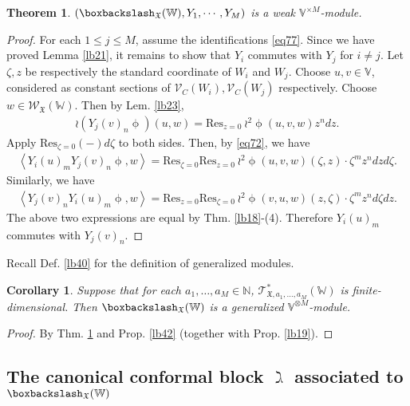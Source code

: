 \documentclass[11pt,b5paper,notitlepage]{article}
\theoremstyle{definition}
\theoremstyle{plain}
\newtheorem{thm}[df]{Theorem}
\newtheorem{co}[df]{Corollary}
\newcommand{\fk}{\mathfrak}
\newcommand{\Res}{\mathrm{Res}}
\newcommand{\SV}{\mathscr{V}}
\newcommand{\scr}{\mathscr}
\newcommand{\Vbb}{\mathbb V}
\newcommand{\Wbb}{\mathbb W}
\newcommand{\Nbb}{\mathbb N}
\newcommand{\<}{\left\langle}
\renewcommand{\>}{\right\rangle}
\newcommand{\fx}{\mathfrak{X}}
\newcommand{\bbs}{\boxbackslash}
\numberwithin{equation}{section}
\begin{document}
\begin{thm}\label{lb43}
    $(\boxbackslash_\fx(\Wbb),Y_1,\cdots,Y_M)$ is a weak $\Vbb^{\times M}$-module.
\end{thm}
\begin{proof}
For each $1\leq j\leq M$, assume the identifications \eqref{eq77}.   Since we have proved Lemma \ref{lb21},  it remains to show that $Y_i$ commutes with $Y_j$ for $i\ne j$. Let $\zeta,z$ be respectively the standard coordinate of $W_i$ and $W_j$. Choose $u,v\in \Vbb$, considered as constant sections of $\SV_C(W_i),\SV_C(W_j)$ respectively. Choose $w\in\scr W_{\fk X}(\Wbb)$. Then by Lem. \ref{lb23},
\begin{align*}
\wr(Y_j(v)_n\upphi)(u,w)=\Res_{z=0}~{\wr^2\upphi}(u,v,w)z^n dz.
\end{align*}
Apply $\Res_{\zeta=0}(-)d\zeta$ to both sides.  Then, by \eqref{eq72}, we have
\begin{align}
\<Y_i(u)_mY_j(v)_n\upphi,w\>=\Res_{\zeta=0}\Res_{z=0}~{\wr^2 \upphi}(u,v,w)(\zeta,z)\cdot \zeta^m z^n dzd\zeta.
\end{align}
    Similarly, we have
\begin{align*}
\<Y_j(v)_nY_i(u)_m\upphi,w\>=\Res_{z=0}\Res_{\zeta=0}~{\wr^2 \upphi}(v,u,w)(z,\zeta)\cdot \zeta^m z^n d\zeta dz.
\end{align*}
The above two expressions are equal by Thm. \ref{lb18}-(4). Therefore $Y_i(u)_m$ commutes with $Y_j(v)_n$.
\end{proof}




Recall Def. \ref{lb40} for the definition of generalized modules. 

\begin{co}\label{lb44}
Suppose that for each $a_1,\dots,a_M\in\Nbb$, $\scr T_{\fk X,a_1,\dots,a_M}^*(\Wbb)$ is finite-dimensional. Then $\bbs_\fx(\Wbb)$ is a generalized $\Vbb^{\otimes M}$-module.
\end{co}

\begin{proof}
By Thm. \ref{lb43} and Prop. \ref{lb42} (together with Prop. \ref{lb19}).
\end{proof}










\subsection{The canonical conformal block $\gimel$ associated to $\boxbackslash_{\fx}(\Wbb)$}  \label{lb58}
\end{document}
